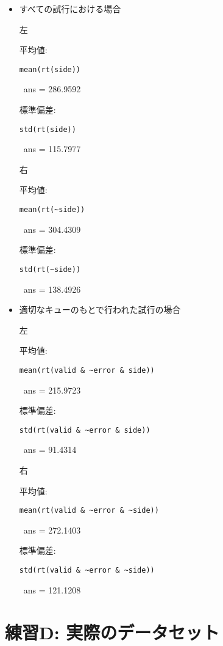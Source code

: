 \documentclass{jsarticle}
\begin{document}
\begin{itemize}
\item すべての試行における場合

左

平均値: {\tt mean(rt(side)) 

\ ans = 286.9592}

標準偏差: {\tt std(rt(side)) 

\ ans = 115.7977}

右

平均値: {\tt mean(rt(\verb|~side|)) 

\ ans = 304.4309}

標準偏差: {\tt std(rt(\verb|~side|)) 

\ ans = 138.4926}

\bigskip

\item 適切なキューのもとで行われた試行の場合

左

平均値: {\tt mean(rt(valid \& \verb|~error| \& side))

\ ans = 215.9723}

標準偏差: {\tt std(rt(valid \& \verb|~error| \& side)) 

\ ans = 91.4314}

右

平均値: {\tt mean(rt(valid \& \verb|~error| \& \verb|~side|)) 

\ ans = 272.1403}

標準偏差: {\tt std(rt(valid \& \verb|~error| \& \verb|~side|)) 

\ ans = 121.1208}

\end{itemize}

\section{練習D: 実際のデータセット}
\end{document}
